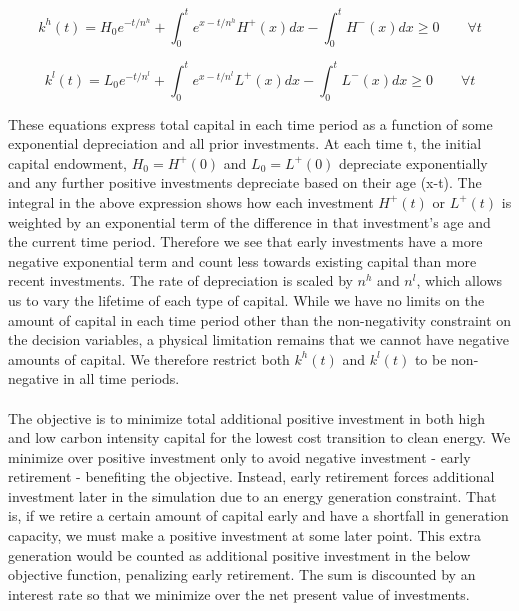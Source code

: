 \documentclass{article}
\begin{document}
\begin{equation}\label{eq:simpleHCapitalConstraint}
k^h(t) = H_0 e^{-t/n^h} + \int_0^t e^{x-t/n^h} H^+(x) dx - \int_0^t H^-(x)dx \geq 0 \qquad \forall t
\end{equation}

\begin{equation}\label{eq:simpleLCapitalConstraint}
k^l(t) = L_0 e^{-t/n^l} + \int_0^t e^{x-t/n^l} L^+(x) dx - \int_0^t L^-(x)dx \geq 0 \qquad \forall t
\end{equation}

These equations express total capital in each time period as a function of some exponential depreciation and all prior investments. At each time t, the initial capital endowment, $H_0 = H^+(0)$ and $L_0 = L^+(0)$ depreciate exponentially and any further positive investments depreciate based on their age (x-t). The integral in the above expression shows how each investment $H^+(t)$ or $L^+(t)$ is weighted by an exponential term of the difference in that investment's age and the current time period. Therefore we see that early investments have a more negative exponential term and count less towards existing capital than more recent investments. The rate of depreciation is scaled by $n^h$ and $n^l$, which allows us to vary the lifetime of each type of capital. While we have no limits on the amount of capital in each time period other than the non-negativity constraint on the decision variables, a physical limitation remains that we cannot have negative amounts of capital. We therefore restrict both $k^h(t)$ and $k^l(t)$ to be non-negative in all time periods. 


\paragraph{} The objective is to minimize total additional positive investment in both high and low carbon intensity capital for the lowest cost transition to clean energy. We minimize over positive investment only to avoid negative investment - early retirement - benefiting the objective. Instead, early retirement forces additional investment later in the simulation due to an energy generation constraint. That is, if we retire a certain amount of capital early and have a shortfall in generation capacity, we must make a positive investment at some later point. This extra generation would be counted as additional positive investment in the below objective function, penalizing early retirement. The sum is discounted by an interest rate so that we minimize over the net present value of investments. 
\end{document}
